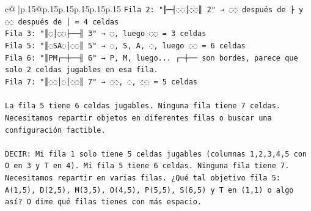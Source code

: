 \documentclass{article}
\begin{document}
{\begin{supertabular}{c@{$\;$}|p{.15\linewidth}@{}p{.15\linewidth}p{.15\linewidth}p{.15\linewidth}p{.15\linewidth}p{.15\linewidth}}
{{{\texttt{Fila 2: "╟─┤◌◌│◌◌║ 2" → ◌◌ después de ├ y ◌◌ después de │ = 4 celdas} \\
\texttt{Fila 3: "║◌│◌◌├──╢ 3" → ◌, luego ◌◌ = 3 celdas} \\
\texttt{Fila 5: "║◌SA◌│◌◌║ 5" → ◌, S, A, ◌, luego ◌◌ = 6 celdas} \\
\texttt{Fila 6: "║PM┌─┼──╢ 6" → P, M, luego... ┌─┼── son bordes, parece que solo 2 celdas jugables en esa fila.} \\
\texttt{Fila 7: "║◌◌│◌│◌◌║ 7" → ◌◌, ◌, ◌◌ = 5 celdas} \\
\\ 
\texttt{La fila 5 tiene 6 celdas jugables. Ninguna fila tiene 7 celdas. Necesitamos repartir objetos en diferentes filas o buscar una configuración factible.} \\
\\ 
\texttt{DECIR: Mi fila 1 solo tiene 5 celdas jugables (columnas 1,2,3,4,5 con O en 3 y T en 4). Mi fila 5 tiene 6 celdas. Ninguna fila tiene 7. Necesitamos repartir en varias filas. ¿Qué tal objetivo fila 5: A(1,5), D(2,5), M(3,5), O(4,5), P(5,5), S(6,5) y T en (1,1) o algo así? O dime qué filas tienes con más espacio.} \\
            }
        }
    }
     \\ \\


\end{supertabular}}
\end{document}
